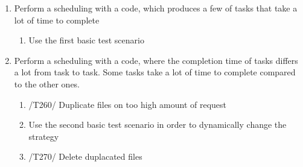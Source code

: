 {\begin{enumerate}
\begin{enumerate}
		   	   \end{enumerate}
		   	\item Perform a scheduling with a code, which produces a few of tasks that take a lot of time to complete
		   	
		   	   \begin{enumerate}
		   			\item Use the first basic test scenario
		   	   \end{enumerate}
		   	\item Perform a scheduling with a code, where the completion time of tasks differs a lot from task to task. Some tasks take a lot of time to complete compared to the other ones.
		      	\begin{enumerate}
		      		\item /T260/ Duplicate files on too high amount of request
		   			\item Use the second basic test scenario  in order to dynamically change the strategy
		   			\item /T270/ Delete duplacated files
		      	\end{enumerate}
		   \end{enumerate}	
}
